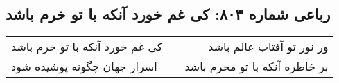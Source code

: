 \begin{center}
\section*{رباعی شماره ۸۰۳: کی غم خورد آنکه با تو خرم باشد}
\label{sec:0803}
\begin{longtable}{l p{0.5cm} r}
کی غم خورد آنکه با تو خرم باشد
&&
ور نور تو آفتاب عالم باشد
\\
اسرار جهان چگونه پوشیده شود
&&
بر خاطره آنکه با تو محرم باشد
\\
\end{longtable}
\end{center}
